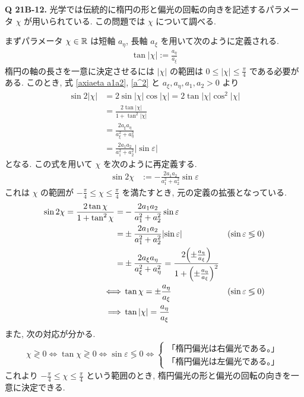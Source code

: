 \documentclass[a4paper,dvipdfmx]{jsarticle}
\theoremstyle{definition}
\begin{document}
\textbf{Q 21B-12.}
光学では伝統的に楕円の形と偏光の回転の向きを記述するパラメータ $\chi$ が用いられている. この問題では $\chi$ について調べる.

まずパラメータ $\chi\in\mathbb{R}$ は短軸 $a_\eta$, 長軸 $a_\xi$ を用いて次のように定義される.
\begin{align}
  \tan{|\chi|} := \frac{a_\eta}{a_\xi}
\end{align}
楕円の軸の長さを一意に決定させるには $|\chi|$ の範囲は $0 \leq |\chi| \leq \frac{\pi}{4}$ である必要がある. このとき, 式 \eqref{axiaeta a1a2}, \eqref{a^2} と $a_\xi, a_\eta, a_1, a_2 > 0$ より
\begin{align}
  \sin{2|\chi|} & = 2\sin|\chi|\cos|\chi| = 2\tan|\chi|\cos^2|\chi|           \\
                & = \frac{2\tan|\chi|}{1 + \tan^2|\chi|}                      \\
                & = \frac{2a_\xi a_\eta}{a_\xi^2 + a_\eta^2}                  \\
                & = \frac{2a_1 a_2}{a_1^2 + a_2^2}\lvert\sin\varepsilon\rvert
\end{align}
となる. この式を用いて $\chi$ を次のように再定義する.
\begin{align}
  \sin{2\chi} & := -\frac{2a_1 a_2}{a_1^2 + a_2^2}\sin\varepsilon \label{chi def}
\end{align}
これは $\chi$ の範囲が $-\frac{\pi}{4} \leq \chi \leq \frac{\pi}{4}$ を満たすとき, 元の定義の拡張となっている.
\begin{align}
  \sin2\chi = \frac{2\tan\chi}{1 + \tan^2\chi}
  =        & -\frac{2a_1 a_2}{a_1^2 + a_2^2}\sin\varepsilon                                                                                                          \\
  =        & \pm\frac{2a_1 a_2}{a_1^2 + a_2^2}\lvert\sin\varepsilon\rvert                                                             & (\sin\varepsilon \lessgtr 0) \\
  =        & \pm\frac{2a_\xi a_\eta}{a_\xi^2 + a_\eta^2} = \frac{2\qty(\pm\frac{a_\eta}{a_\xi})}{1 + \qty(\pm\frac{a_\eta}{a_\xi})^2}                                \\
  \iff     & \tan\chi = \pm\frac{a_\eta}{a_\xi}                                                                                       & (\sin\varepsilon \lessgtr 0) \\
  \implies & \tan|\chi| = \frac{a_\eta}{a_\xi}
\end{align}
また, 次の対応が分かる.
\begin{align}
  \chi \gtrless 0 \iff \tan\chi \gtrless 0 \iff \sin\varepsilon \lessgtr 0 \iff
  \begin{cases}
    \textrm{「楕円偏光は右偏光である。」} \\
    \textrm{「楕円偏光は左偏光である。」}
  \end{cases}
\end{align}
これより $-\frac{\pi}{4} \leq \chi \leq \frac{\pi}{4}$ という範囲のとき, 楕円偏光の形と偏光の回転の向きを一意に決定できる. \\
\end{document}
